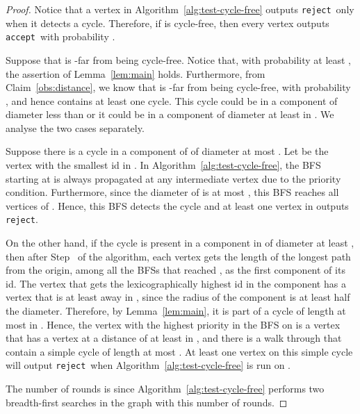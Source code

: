 \documentclass[11pt]{article}
\newcommand{\accept}{\texttt{accept}}
\newcommand{\reject}{\texttt{reject}}
\begin{document}
\begin{proof}
    Notice that a vertex in Algorithm~\ref{alg:test-cycle-free} outputs \reject~only when it detects a cycle.
      Therefore, if  is cycle-free, then every vertex outputs \accept~with probability .

      Suppose that  is -far from being cycle-free. Notice that, with probability at
      least , the assertion of Lemma~\ref{lem:main} holds.  Furthermore, from
      Claim~\ref{obs:distance}, we know that  is -far from being cycle-free,
      with probability , and hence contains at least one cycle.  This cycle
      could be in a component of diameter less than  or it could be in a
      component of diameter at least  in . We analyse the two cases
      separately.

      Suppose there is a cycle in a component  of  of diameter at most . Let 
      be the vertex with the smallest id in . In Algorithm~\ref{alg:test-cycle-free}, the BFS
      starting at  is always propagated at any intermediate vertex due to the priority
      condition. Furthermore, since the diameter of  is at most , this BFS
      reaches all vertices of .  Hence, this BFS detects the cycle and at least one vertex
      in  outputs \reject.

      On the other hand, if the cycle is present in a component in  of diameter at least , then after Step~ of the algorithm, each vertex  gets the
      length of the longest path from the origin, among all the BFSs that reached , as the
      first component of its id. The vertex  that gets the lexicographically highest id in the
      component has a vertex  that is at least  away in , since the radius
      of the component is at least half the diameter. Therefore, by Lemma~\ref{lem:main}, it is part
      of a cycle of length at most  in . Hence, the vertex with the highest
      priority in the BFS on  is a vertex  that has a vertex at a distance of at least  in , and there is a walk through  that contain a simple cycle of length at
      most . At least one vertex on this simple cycle will output \reject~when
      Algorithm~\ref{alg:test-cycle-free} is run on .


      The number of rounds is  since Algorithm~\ref{alg:test-cycle-free}
      performs two breadth-first searches in the graph with this number of rounds.\end{proof}
\end{document}
